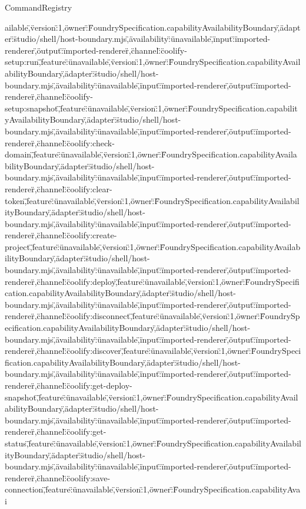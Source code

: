 \begin{lexlean}{CommandRegistry}
\begin{semanticmodule}
{ailable\",\"version\":1,\"owner\":\"FoundrySpecification.capabilityAvailabilityBoundary\",\"adapter\":\"studio/shell/host-boundary.mjs\",\"availability\":\"unavailable\",\"input\":\"imported-renderer\",\"output\":\"imported-renderer\"},{\"channel\":\"coolify-setup:run\",\"feature\":\"unavailable\",\"version\":1,\"owner\":\"FoundrySpecification.capabilityAvailabilityBoundary\",\"adapter\":\"studio/shell/host-boundary.mjs\",\"availability\":\"unavailable\",\"input\":\"imported-renderer\",\"output\":\"imported-renderer\"},{\"channel\":\"coolify-setup:snapshot\",\"feature\":\"unavailable\",\"version\":1,\"owner\":\"FoundrySpecification.capabilityAvailabilityBoundary\",\"adapter\":\"studio/shell/host-boundary.mjs\",\"availability\":\"unavailable\",\"input\":\"imported-renderer\",\"output\":\"imported-renderer\"},{\"channel\":\"coolify:check-domain\",\"feature\":\"unavailable\",\"version\":1,\"owner\":\"FoundrySpecification.capabilityAvailabilityBoundary\",\"adapter\":\"studio/shell/host-boundary.mjs\",\"availability\":\"unavailable\",\"input\":\"imported-renderer\",\"output\":\"imported-renderer\"},{\"channel\":\"coolify:clear-token\",\"feature\":\"unavailable\",\"version\":1,\"owner\":\"FoundrySpecification.capabilityAvailabilityBoundary\",\"adapter\":\"studio/shell/host-boundary.mjs\",\"availability\":\"unavailable\",\"input\":\"imported-renderer\",\"output\":\"imported-renderer\"},{\"channel\":\"coolify:create-project\",\"feature\":\"unavailable\",\"version\":1,\"owner\":\"FoundrySpecification.capabilityAvailabilityBoundary\",\"adapter\":\"studio/shell/host-boundary.mjs\",\"availability\":\"unavailable\",\"input\":\"imported-renderer\",\"output\":\"imported-renderer\"},{\"channel\":\"coolify:deploy\",\"feature\":\"unavailable\",\"version\":1,\"owner\":\"FoundrySpecification.capabilityAvailabilityBoundary\",\"adapter\":\"studio/shell/host-boundary.mjs\",\"availability\":\"unavailable\",\"input\":\"imported-renderer\",\"output\":\"imported-renderer\"},{\"channel\":\"coolify:disconnect\",\"feature\":\"unavailable\",\"version\":1,\"owner\":\"FoundrySpecification.capabilityAvailabilityBoundary\",\"adapter\":\"studio/shell/host-boundary.mjs\",\"availability\":\"unavailable\",\"input\":\"imported-renderer\",\"output\":\"imported-renderer\"},{\"channel\":\"coolify:discover\",\"feature\":\"unavailable\",\"version\":1,\"owner\":\"FoundrySpecification.capabilityAvailabilityBoundary\",\"adapter\":\"studio/shell/host-boundary.mjs\",\"availability\":\"unavailable\",\"input\":\"imported-renderer\",\"output\":\"imported-renderer\"},{\"channel\":\"coolify:get-deploy-snapshot\",\"feature\":\"unavailable\",\"version\":1,\"owner\":\"FoundrySpecification.capabilityAvailabilityBoundary\",\"adapter\":\"studio/shell/host-boundary.mjs\",\"availability\":\"unavailable\",\"input\":\"imported-renderer\",\"output\":\"imported-renderer\"},{\"channel\":\"coolify:get-status\",\"feature\":\"unavailable\",\"version\":1,\"owner\":\"FoundrySpecification.capabilityAvailabilityBoundary\",\"adapter\":\"studio/shell/host-boundary.mjs\",\"availability\":\"unavailable\",\"input\":\"imported-renderer\",\"output\":\"imported-renderer\"},{\"channel\":\"coolify:save-connection\",\"feature\":\"unavailable\",\"version\":1,\"owner\":\"FoundrySpecification.capabilityAvai}
\end{semanticmodule}
\end{lexlean}

